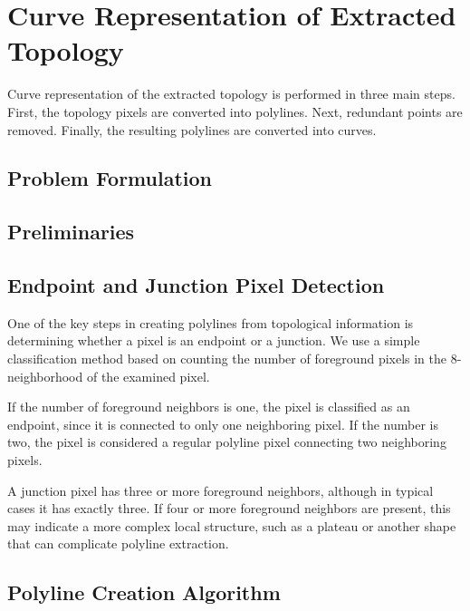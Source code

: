 \chapter{Curve Representation of Extracted Topology}

\captionsetup[algorithm]{
	labelfont=bf,
	justification=raggedright,
	singlelinecheck=false
}

Curve representation of the extracted topology is performed in three main steps. First, the topology pixels are converted into polylines. Next, redundant points are removed. Finally, the resulting polylines are converted into curves.

\section{Problem Formulation}

\section{Preliminaries}

\section{Endpoint and Junction Pixel Detection}

One of the key steps in creating polylines from topological information is determining whether a pixel is an endpoint or a junction. We use a simple classification method based on counting the number of foreground pixels in the 8-neighborhood of the examined pixel.

If the number of foreground neighbors is one, the pixel is classified as an endpoint, since it is connected to only one neighboring pixel. If the number is two, the pixel is considered a regular polyline pixel connecting two neighboring pixels.


A junction pixel has three or more foreground neighbors, although in typical cases it has exactly three. If four or more foreground neighbors are present, this may indicate a more complex local structure, such as a plateau or another shape that can complicate polyline extraction.

\section{Polyline Creation Algorithm}

